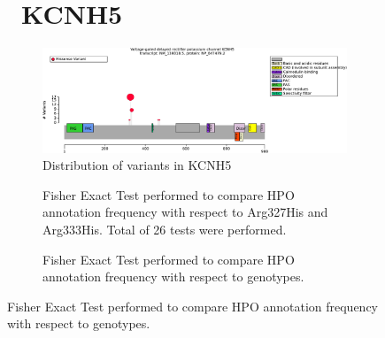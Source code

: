 \begin{figure}[htbp]
\section*{ KCNH5}
\centering
\begin{subfigure}[b]{0.95\textwidth}
\centering
\includegraphics[width=\textwidth]{ img/KCNH5_protein_diagram.pdf} 
\captionsetup{justification=raggedright,singlelinecheck=false}
\caption{Distribution of variants in KCNH5}
\end{subfigure}

\vspace{2em}

\begin{subfigure}[b]{0.95\textwidth}
\centering
{}
\captionsetup{justification=raggedright,singlelinecheck=false}
\caption{Fisher Exact Test performed to compare HPO annotation frequency with respect to Arg327His and Arg333His. Total of
        26 tests were performed.}
\end{subfigure}
\vspace{2em}
\begin{subfigure}[b]{0.95\textwidth}
\centering
{}
\captionsetup{justification=raggedright,singlelinecheck=false}
\caption{Fisher Exact Test performed to compare HPO annotation frequency with respect to genotypes.}
\end{subfigure}


\end{figure}
